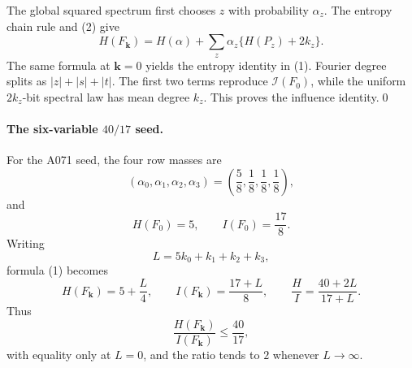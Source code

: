 The global squared spectrum first chooses $z$ with probability $\alpha_z$.
The entropy chain rule and (2) give
\[
 H(F_{\boldsymbol k})
 =H(\alpha)+\sum_z\alpha_z\{H(P_z)+2k_z\}.
\]
The same formula at $\boldsymbol k=0$ yields the entropy identity in (1).
Fourier degree splits as $|z|+|s|+|t|$.  The first two terms reproduce
$\mathcal I(F_0)$, while the uniform $2k_z$-bit spectral law has mean degree
$k_z$.  This proves the influence identity.\qed

\paragraph{The six-variable $40/17$ seed.}
For the A071 seed, the four row masses are
\[
 (\alpha_0,\alpha_1,\alpha_2,\alpha_3)
 =\left(\frac58,\frac18,\frac18,\frac18\right),
\]
and
\[
 H(F_0)=5,\qquad I(F_0)=\frac{17}{8}.
\]
Writing
\[
 L=5k_0+k_1+k_2+k_3,
\]
formula (1) becomes
\[
 H(F_{\boldsymbol k})=5+\frac L4,
 \qquad I(F_{\boldsymbol k})=\frac{17+L}{8},
 \qquad
 \frac{H}{I}=\frac{40+2L}{17+L}.                     \tag{3}
\]
Thus
\[
 \frac{H(F_{\boldsymbol k})}{I(F_{\boldsymbol k})}
 \le\frac{40}{17},
\]
with equality only at $L=0$, and the ratio tends to $2$ whenever
$L\to\infty$.

